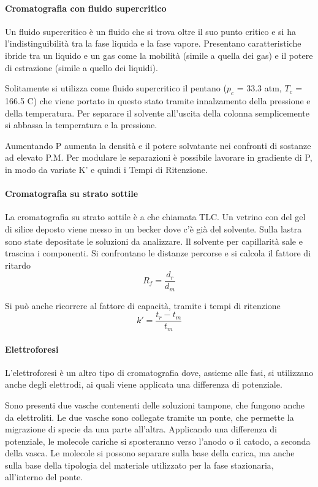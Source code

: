 \paragraph{Cromatografia con fluido supercritico} 

Un fluido supercritico è un fluido che si trova oltre il suo punto critico e si ha l'indistinguibilità tra la fase liquida e la fase vapore. Presentano caratteristiche ibride tra un liquido e un gas come la mobilità (simile a quella dei gas) e il potere di estrazione (simile a quello dei liquidi). 


Solitamente si utilizza come fluido supercritico il pentano ($p_c$ = 33.3 atm, $T_c$ = 166.5 \degree C) che viene portato in questo stato tramite innalzamento della pressione e della temperatura. Per separare il solvente all'uscita della colonna semplicemente si abbassa la temperatura e la pressione.

Aumentando P aumenta la densità e il potere solvatante nei confronti di sostanze ad elevato P.M.
Per modulare le separazioni è possibile lavorare in gradiente di P, in modo da variate K' e quindi i Tempi di Ritenzione.

\paragraph{Cromatografia su strato sottile}
La cromatografia su strato sottile è a che chiamata TLC.
Un vetrino con del gel di silice deposto viene messo in un becker dove c'è già del solvente. Sulla lastra sono state depositate le soluzioni da analizzare.
Il solvente per capillarità sale e trascina i componenti.
Si confrontano le distanze percorse e si calcola il fattore di ritardo
\[
R_f = \frac{d_r}{d_m}
\]

Si può anche ricorrere al fattore di capacità, tramite i tempi di ritenzione
\[
k' = \frac{t_r - t_m}{t_m}
\]

\paragraph{Elettroforesi}
L'elettroforesi è un altro tipo di cromatografia dove, assieme alle fasi, si utilizzano anche degli elettrodi, ai quali viene applicata una differenza di potenziale.


Sono presenti due vasche contenenti delle soluzioni tampone, che fungono anche da elettroliti.
Le due vasche sono collegate tramite un ponte, che permette la migrazione di specie da una parte all'altra.
Applicando una differenza di potenziale, le molecole cariche si sposteranno verso l'anodo o il catodo, a seconda della vasca.
Le molecole si possono separare sulla base della carica, ma anche sulla base della tipologia del materiale utilizzato per la fase stazionaria, all'interno del ponte.

